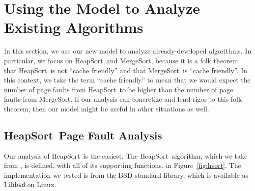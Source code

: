\documentclass{acmtrans2m}
\newcommand{\heapsort}{{\sc HeapSort}}
\newcommand{\mergesort}{{\sc MergeSort}}
\begin{document}
\section{Using the Model to Analyze Existing Algorithms}
\label{analysis}

In this section, we use our new model to analyze already-developed algorithms.
In particular, we focus on \heapsort\ and \mergesort, because it is a folk
theorem that \heapsort\ is not ``cache friendly'' and that \mergesort\ is
``cache friendly''.  In this context, we take the term ``cache friendly'' to
mean that we would expect the number of page faults from \heapsort\ to be
higher than the number of page faults from \mergesort. If our analysis can
concretize and lend rigor to this folk theorem, then our model might be useful
in other situations as well.

\subsection{\heapsort\ Page Fault Analysis} 

Our analysis of \heapsort\ is the easiest.  The \heapsort\ algorithm, which we
take from , is defined, with all of its supporting functions, in
Figure~\ref{fig:hsort}.  The implementation we tested is from the BSD standard
library, which is available as {\tt libbsd} on Linux.
\end{document}
